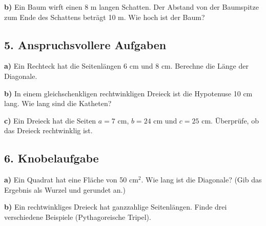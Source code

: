 \begin{center}
\end{center}

\textbf{b)} Ein Baum wirft einen 8 m langen Schatten. Der Abstand von der Baumspitze zum Ende des Schattens beträgt 10 m. Wie hoch ist der Baum?

\vspace{0.5cm}

\subsection*{5. Anspruchsvollere Aufgaben}
\textbf{a)} Ein Rechteck hat die Seitenlängen 6 cm und 8 cm. Berechne die Länge der Diagonale.

\textbf{b)} In einem gleichschenkligen rechtwinkligen Dreieck ist die Hypotenuse 10 cm lang. Wie lang sind die Katheten?

\textbf{c)} Ein Dreieck hat die Seiten $a = 7$ cm, $b = 24$ cm und $c = 25$ cm. Überprüfe, ob das Dreieck rechtwinklig ist.

\vspace{0.5cm}

\subsection*{6. Knobelaufgabe}
\textbf{a)} Ein Quadrat hat eine Fläche von 50 cm$^2$. Wie lang ist die Diagonale? (Gib das Ergebnis als Wurzel und gerundet an.)

\textbf{b)} Ein rechtwinkliges Dreieck hat ganzzahlige Seitenlängen. Finde drei verschiedene Beispiele (Pythagoreische Tripel).

